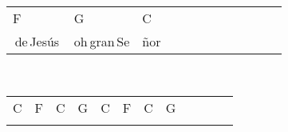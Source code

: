 \begin{multicols}{2}
\begin{minipage}{\columnwidth}
\noindent
\begin{tabular}{llllllllllll}
F&G&C\\
\,de\,Jesús\,&oh\,gran\,Se&ñor
\end{tabular}
\end{minipage}\\

\noindent
\begin{minipage}{\columnwidth}
\noindent
\noindent
\begin{tabular}{llllllllllll}
C&F&C&G&C&F&C&G\\
\quad\quad&\quad\quad&\quad\quad&\quad\quad\quad\quad\quad&\quad\quad&\quad\quad&\quad\quad&
\end{tabular}
\end{minipage}\\

\end{multicols}